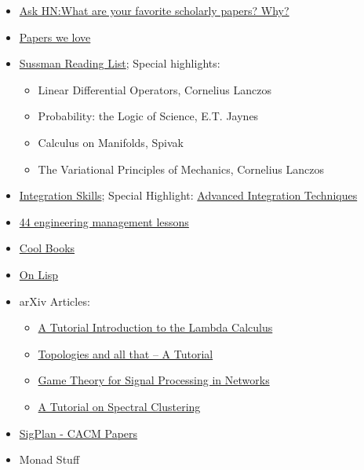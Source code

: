 

\begin{itemize}
\item
  \href{https://news.ycombinator.com/item?id=8675672}{Ask HN:What are
  your favorite scholarly papers? Why?}
\item
  \href{https://github.com/papers-we-love/papers-we-love}{Papers we
  love}
\item
  \href{http://aurellem.org/thoughts/html/sussman-reading-list.html}{Sussman
  Reading List}; Special highlights:

  \begin{itemize}
  \item
    Linear Differential Operators, Cornelius Lanczos
  \item
    Probability: the Logic of Science, E.T. Jaynes
  \item
    Calculus on Manifolds, Spivak
  \item
    The Variational Principles of Mechanics, Cornelius Lanczos
  \end{itemize}
\item
  \href{http://math.stackexchange.com/questions/765198/some-users-are-mind-bogglingly-skilled-at-integration-how-did-they-get-there/1063528\#1063528}{Integration
  Skills}; Special Highlight:
  \href{http://faculty.swosu.edu/michael.dougherty/book/chapter07.pdf}{Advanced
  Integration Techniques}
\item
  \href{http://www.defmacro.org/2014/10/03/engman.html}{44 engineering
  management lessons}
\item
  \href{https://news.ycombinator.com/item?id=9674080}{Cool Books}
\item
  \href{http://www.paulgraham.com/onlisptext.html}{On Lisp}
\item
  arXiv Articles:

  \begin{itemize}
  \item
    \href{http://arxiv.org/abs/1503.09060}{A Tutorial Introduction to
    the Lambda Calculus}
  \item
    \href{http://arxiv.org/abs/1503.00875}{Topologies and all that -- A
    Tutorial}
  \item
    \href{http://arxiv.org/abs/1506.00982}{Game Theory for Signal
    Processing in Networks}
  \item
    \href{http://arxiv.org/abs/0711.0189}{A Tutorial on Spectral
    Clustering}
  \end{itemize}
\item
  \href{http://www.sigplan.org/Newsletters/CACM/Papers/}{SigPlan - CACM
  Papers}
\item
  Monad Stuff


\end{itemize}
